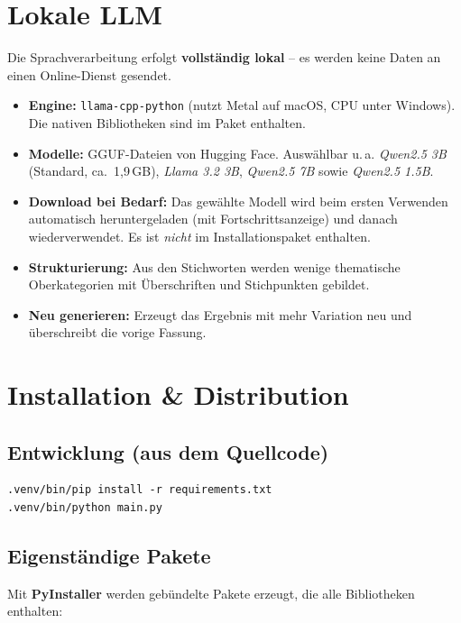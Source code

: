 \documentclass[11pt,a4paper]{article}
\begin{document}
\section{Lokale LLM}

Die Sprachverarbeitung erfolgt \textbf{vollst\"andig lokal} -- es werden keine
Daten an einen Online-Dienst gesendet.

\begin{itemize}
  \item \textbf{Engine:} \texttt{llama-cpp-python} (nutzt Metal auf macOS, CPU
        unter Windows). Die nativen Bibliotheken sind im Paket enthalten.
  \item \textbf{Modelle:} GGUF-Dateien von Hugging Face. Ausw\"ahlbar u.\,a.
        \emph{Qwen2.5 3B} (Standard, ca.\ 1{,}9\,GB), \emph{Llama 3.2 3B},
        \emph{Qwen2.5 7B} sowie \emph{Qwen2.5 1.5B}.
  \item \textbf{Download bei Bedarf:} Das gew\"ahlte Modell wird beim ersten
        Verwenden automatisch heruntergeladen (mit Fortschrittsanzeige) und
        danach wiederverwendet. Es ist \emph{nicht} im Installationspaket
        enthalten.
  \item \textbf{Strukturierung:} Aus den Stichworten werden wenige thematische
        Oberkategorien mit \"Uberschriften und Stichpunkten gebildet.
  \item \textbf{Neu generieren:} Erzeugt das Ergebnis mit mehr Variation neu und
        \"uberschreibt die vorige Fassung.
\end{itemize}

\section{Installation \& Distribution}

\subsection*{Entwicklung (aus dem Quellcode)}
\begin{verbatim}
.venv/bin/pip install -r requirements.txt
.venv/bin/python main.py
\end{verbatim}

\subsection*{Eigenst\"andige Pakete}
Mit \textbf{PyInstaller} werden gebündelte Pakete erzeugt, die alle Bibliotheken
enthalten:
\end{document}
